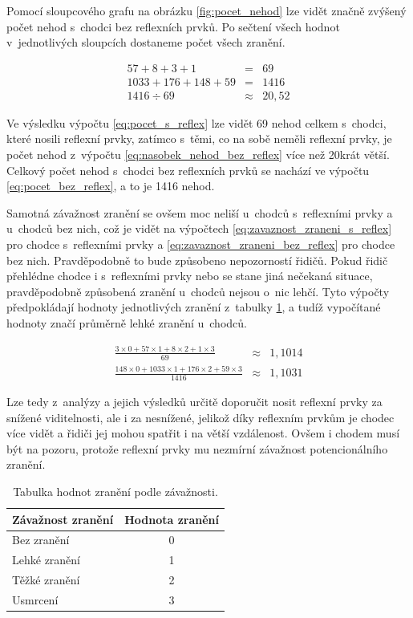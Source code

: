 \documentclass[a4paper, 11pt]{article}
\begin{document}
Pomocí sloupcového grafu na obrázku \ref{fig:pocet_nehod} lze vidět značně zvýšený počet nehod s~chodci bez reflexních prvků. Po sečtení všech hodnot v~jednotlivých sloupcích dostaneme počet všech zranění.

\begin{eqnarray}
    \label{eq:pocet_s_reflex}57+8+3+1 & = & 69\\
    \label{eq:pocet_bez_reflex}1033+176+148+59 & = & 1416\\
    \label{eq:nasobek_nehod_bez_reflex}1416\div 69 & \approx & 20,52
\end{eqnarray}

Ve výsledku výpočtu \ref{eq:pocet_s_reflex} lze vidět 69 nehod celkem s~chodci, které nosili reflexní prvky, zatímco s~těmi, co na sobě neměli reflexní prvky, je počet nehod z~výpočtu \ref{eq:nasobek_nehod_bez_reflex} více než 20krát větší. Celkový počet nehod s~chodci bez reflexních prvků se nachází ve výpočtu \ref{eq:pocet_bez_reflex}, a to je 1416 nehod.

Samotná závažnost zranění se ovšem moc neliší u~chodců s~reflexními prvky a u~chodců bez nich, což je vidět na výpočtech \ref{eq:zavaznost_zraneni_s_reflex} pro chodce s~reflexními prvky a \ref{eq:zavaznost_zraneni_bez_reflex} pro chodce bez nich. Pravděpodobně to bude způsobeno nepozorností řidičů. Pokud řidič přehlédne chodce i s~reflexními prvky nebo se stane jiná nečekaná situace, pravděpodobně způsobená zranění u~chodců nejsou o~nic lehčí. Tyto výpočty předpokládají hodnoty jednotlivých zranění z~tabulky \ref{tab:zraneni_hodnota}, a tudíž vypočítané hodnoty značí průměrně lehké zranění u~chodců.

\begin{eqnarray}
    \label{eq:zavaznost_zraneni_s_reflex}\frac{3\times0+57\times1+8\times2+1\times3}{69} & \approx & 1,1014\\[12pt]
    \label{eq:zavaznost_zraneni_bez_reflex}\frac{148\times0+1033\times1+176\times2+59\times3}{1416} & \approx & 1,1031
\end{eqnarray}

Lze tedy z~analýzy a jejich výsledků určitě doporučit nosit reflexní prvky za snížené viditelnosti, ale i za nesnížené, jelikož díky reflexním prvkům je chodec více vidět a řidiči jej mohou spatřit i na větší vzdálenost. Ovšem i chodem musí být na pozoru, protože reflexní prvky mu nezmírní závažnost potencionálního zranění.

\begin{table}[H]
    \centering
    \begin{tabular}{|l|c|}
        \toprule
        Závažnost zranění & Hodnota zranění \\
        \midrule
        Bez zranění & 0 \\
        Lehké zranění & 1 \\
        Těžké zranění & 2 \\
        Usmrcení & 3 \\
        \bottomrule
    \end{tabular}
    \caption{Tabulka hodnot zranění podle závažnosti.}
    \label{tab:zraneni_hodnota}
\end{table}
\end{document}

